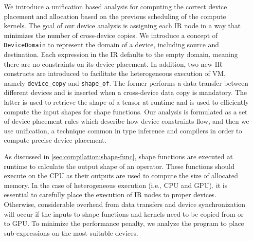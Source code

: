We introduce a unification based analysis for computing the correct device placement and
  allocation based on the previous scheduling of the compute kernels.
The goal of our device analysis is assigning each IR node in a way that minimizes
  the number of cross-device copies. We introduce a concept of \texttt{DeviceDomain}
  to represent the domain of a device, including source and destination.
Each expression in the IR defaults to the empty domain, meaning there
  are no constraints on its device placement.
In addition, two new IR constructs are introduced to facilitate the heterogeneous execution of VM,
  namely \verb|device_copy| and \verb|shape_of|.
The former performs a data transfer between different devices and is
  inserted when a cross-device data copy is mandatory.
The latter is used to retrieve the shape of a tensor at runtime and is
  used to efficiently compute the input shapes for shape functions.
Our analysis is formulated as a set of device placement rules which describe how device constraints
  flow, and then we use unification, a technique common in type inference and compilers
  in order to compute precise device placement.

As discussed in \autoref{sec:compilation:shape-func},
  shape functions are executed at runtime to calculate the output shape of an operator.
These functions should execute on the CPU as their outputs are used to compute the size of allocated memory.
In the case of heterogeneous execution (i.e., CPU and GPU),
  it is essential to carefully place the execution of IR nodes to proper devices.
Otherwise, considerable overhead from data transfers and device synchronization will
  occur if the inputs to shape functions and kernels need to be copied from or to GPU.
To minimize the performance penalty, we analyze the program to place sub-expressions on the most suitable devices.


